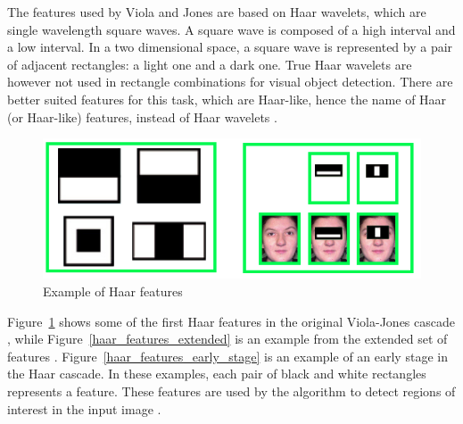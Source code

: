 \vspace{\baselineskip}
\noindent The features used by Viola and Jones are based on Haar wavelets, which are single wavelength square waves. A square wave is composed of a high interval and a low interval. In a two dimensional space, a square wave is represented by a pair of adjacent rectangles: a light one and a dark one. True Haar wavelets are however not used in rectangle combinations for visual object detection. There are better suited features for this task, which are Haar-like, hence the name of Haar (or Haar-like) features, instead of Haar wavelets \cite{HEW07}.
\newline

\begin{figure}[!h]
\begin{center}
\noindent \includegraphics[scale=0.7]{figures/haar_features_first_2_stage} 
\newline
\caption{Example of Haar features}
\label{haar_features_first_2_stage}
\end{center} 
\end{figure}

\noindent Figure~\ref{haar_features_first_2_stage} shows some of the first Haar features in the original Viola-Jones cascade \cite{HEW07}, while Figure~\ref{haar_features_extended} is an example from the extended set of features \cite{DIN08}. Figure~\ref{haar_features_early_stage} is an example of an early stage in the Haar cascade. In these examples, each pair of black and white rectangles represents a feature. These features are used by the algorithm to detect regions of interest in the input image \cite{HAR12}.
\newline

